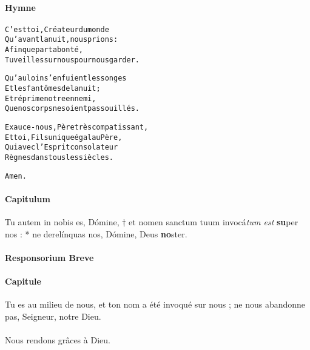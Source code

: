 \documentclass[twoside]{article}
\begin{document}
\begin{paracol}[1]{2}


\switchcolumn

\paragraph{Hymne}
\begin{alltt}\normalfont



             C'est toi, Créateur du monde
             Qu'avant la nuit, nous prions :
             Afin que par ta bonté,
             Tu veilles sur nous pour nous garder.

             Qu'au loin s'enfuient les songes
             Et les fantômes de la nuit ;
             Et réprime notre ennemi,
             Que nos corps ne soient pas souillés.

             Exauce-nous, Père très compatissant,
             Et toi, Fils unique égal au Père,
             Qui avec l'Esprit consolateur
             Règnes dans tous les siècles.
             
             Amen.
\end{alltt}

\switchcolumn*

\paragraph{Capitulum}

Tu autem in nobis es, Dómine, † et nomen sanctum tuum invocá\textit{tum est} \textbf{su}per nos : * ne derelínquas nos, Dómine, Deus \textbf{no}ster.


\pagebreak

\paragraph{Responsorium Breve}


\switchcolumn

\paragraph{Capitule}

 \capsaut Tu es au milieu de nous, et ton nom a été invoqué sur nous ; ne nous abandonne pas, Seigneur, notre Dieu.\\
~\\
\rr Nous rendons grâces à Dieu.


\end{paracol}
\end{document}
